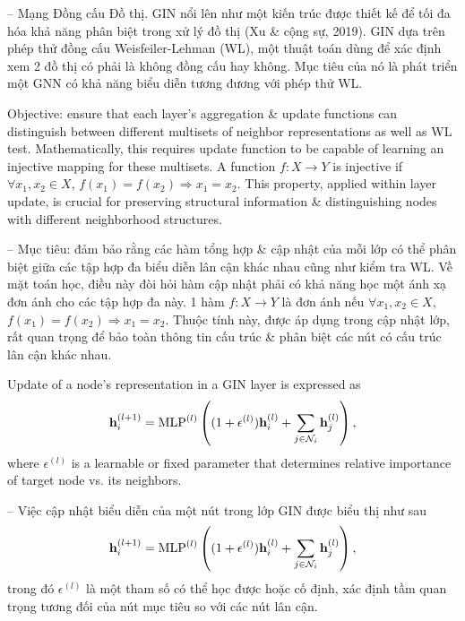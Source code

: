 \documentclass{article}
\begin{document}
\begin{itemize}
\begin{itemize}
\begin{itemize}
            -- {\sf Mạng Đồng cấu Đồ thị.} GIN nổi lên như một kiến trúc được thiết kế để tối đa hóa khả năng phân biệt trong xử lý đồ thị (Xu \& cộng sự, 2019). GIN dựa trên phép thử đồng cấu Weisfeiler-Lehman (WL), một thuật toán dùng để xác định xem 2 đồ thị có phải là không đồng cấu hay không. Mục tiêu của nó là phát triển một GNN có khả năng biểu diễn tương đương với phép thử WL.

            Objective: ensure that each layer's aggregation \& update functions can distinguish between different multisets of neighbor representations as well as WL test. Mathematically, this requires update function to be capable of learning an injective mapping for these multisets. A function $f:X\to Y$ is injective if $\forall x_1,x_2\in X$, $f(x_1) = f(x_2)\Rightarrow x_1 = x_2$. This property, applied within layer update, is crucial for preserving structural information \& distinguishing nodes with different neighborhood structures.

            -- Mục tiêu: đảm bảo rằng các hàm tổng hợp \& cập nhật của mỗi lớp có thể phân biệt giữa các tập hợp đa biểu diễn lân cận khác nhau cũng như kiểm tra WL. Về mặt toán học, điều này đòi hỏi hàm cập nhật phải có khả năng học một ánh xạ đơn ánh cho các tập hợp đa này. 1 hàm $f:X\to Y$ là đơn ánh nếu $\forall x_1,x_2\in X$, $f(x_1) = f(x_2)\Rightarrow x_1 = x_2$. Thuộc tính này, được áp dụng trong cập nhật lớp, rất quan trọng để bảo toàn thông tin cấu trúc \& phân biệt các nút có cấu trúc lân cận khác nhau.

            Update of a node's representation in a GIN layer is expressed as
            \begin{equation*}
                {\bf h}_i^{(l + 1)} = {\rm MLP}^{(l)}\left((1 + \epsilon^{(l)}){\bf h}_i^{(l)} + \sum_{j\in{\cal N}_i} {\bf h}_j^{(l)}\right),
            \end{equation*}
            where $\epsilon^{(l)}$ is a learnable or fixed parameter that determines relative importance of target node vs. its neighbors.

            -- Việc cập nhật biểu diễn của một nút trong lớp GIN được biểu thị như sau
            \begin{equation*}
                {\bf h}_i^{(l + 1)} = {\rm MLP}^{(l)}\left((1 + \epsilon^{(l)}){\bf h}_i^{(l)} + \sum_{j\in{\cal N}_i} {\bf h}_j^{(l)}\right),
            \end{equation*}
            trong đó $\epsilon^{(l)}$ là một tham số có thể học được hoặc cố định, xác định tầm quan trọng tương đối của nút mục tiêu so với các nút lân cận.


\end{itemize}
\end{itemize}
\end{itemize}
\end{document}
